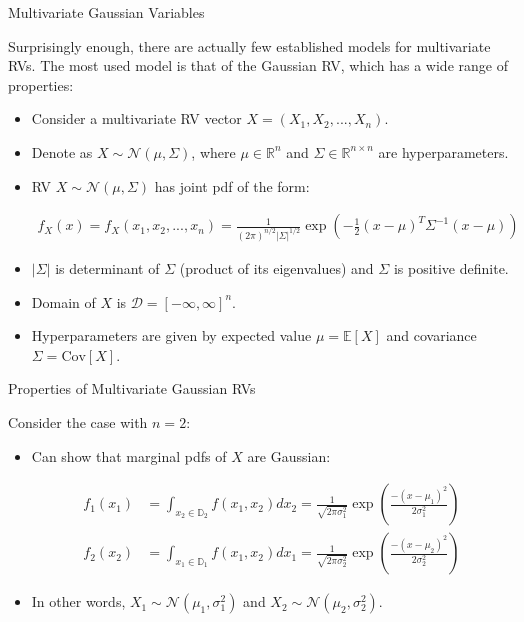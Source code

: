 \documentclass[9pt]{beamer}
\begin{document}
%
\begin{frame}{Multivariate Gaussian Variables}

Surprisingly enough, there are actually few established models for multivariate RVs.  The most used model is that of the Gaussian RV, which has a wide range of properties:

\begin{itemize}
\item Consider a multivariate RV vector $X=(X_1,X_2,...,X_n)$.

\item Denote as $X\sim \mathcal{N}(\mu,\Sigma)$, where $\mu\in \mathbb{R}^n$ and $\Sigma\in \mathbb{R}^{n\times n}$ are hyperparameters. 

\item RV $X\sim \mathcal{N}(\mu,\Sigma)$ has joint pdf of the form:
\begin{block}{}
\begin{align*}
f_X(x)=f_X(x_1,x_2,...,x_n)=\frac{1}{(2\pi)^{n/2}|\Sigma|^{1/2}}\exp\left(-\frac{1}{2}(x-\mu)^T\Sigma^{-1}(x-\mu)\right)
\end{align*}
\end{block}
\item $|\Sigma|$ is determinant of  $\Sigma$ (product of its eigenvalues) and $\Sigma$ is positive definite. 

\item Domain of $X$ is $\mathcal{D}=[-\infty,\infty]^n$. 

\item Hyperparameters are given by expected value $\mu=\mathbb{E}[X]$ and covariance $\Sigma=\textrm{Cov}[X]$.

\end{itemize}

\end{frame}

%
\begin{frame}{Properties of Multivariate Gaussian RVs}

Consider the case with $n=2$:
\begin{itemize}
\item Can show that marginal pdfs of $X$ are Gaussian:
\begin{block}{}
\begin{align*}
f_1(x_1)&=\int_{x_2\in \mathbb{D}_2}f(x_1,x_2)dx_2=\frac{1}{\sqrt{2\pi\sigma_1^2}}\exp \left({\frac{-(x-\mu_1)^2}{2\sigma_1^2}}\right)\\
f_2(x_2)&=\int_{x_1\in \mathbb{D}_1}f(x_1,x_2)dx_1=\frac{1}{\sqrt{2\pi\sigma_2^2}}\exp \left({\frac{-(x-\mu_2)^2}{2\sigma_2^2}}\right)
\end{align*} 
\end{block}
\item In other words, $X_1\sim\mathcal{N}(\mu_1,\sigma_1^2)$ and $X_2\sim\mathcal{N}(\mu_2,\sigma_2^2)$.
\end{itemize}
\end{frame}
\end{document}
